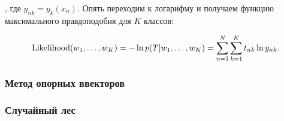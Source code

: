 , где $y_{nk} = y_k(x_n)$. Опять переходим к логарифму и получаем функцию максимального правдоподобия для $K$
классов:

\begin{equation}
 \operatorname*{Likelihood} (w_1,\ldots,w_K) = -\ln p(T|w_1,\ldots,w_K) = \sum_{n=1}^N \sum_{k=1}^K t_{nk}\ln y_{nk}.
\end{equation}


\subsubsection{Метод опорных ввекторов}
















\subsubsection{Случайный лес}
























